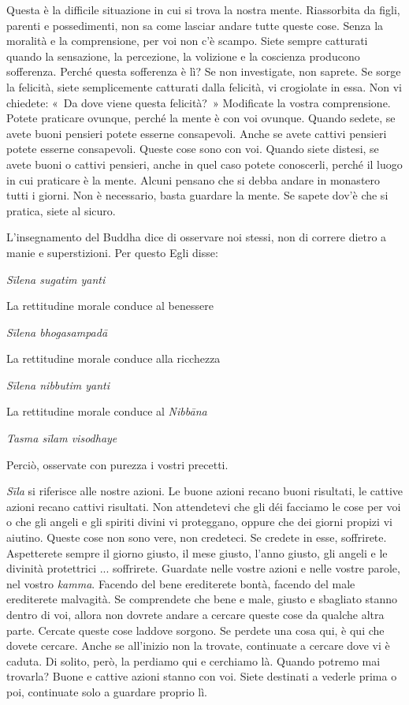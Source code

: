 Questa è la difficile situazione in cui si trova la nostra mente.
Riassorbita da figli, parenti e possedimenti, non sa come lasciar andare
tutte queste cose. Senza la moralità e la comprensione, per voi non c'è
scampo. Siete sempre catturati quando la sensazione, la percezione, la
volizione e la coscienza producono sofferenza. Perché questa sofferenza
è lì? Se non investigate, non saprete. Se sorge la felicità, siete
semplicemente catturati dalla felicità, vi crogiolate in essa. Non vi
chiedete: «~Da dove viene questa felicità?~» Modificate la vostra
comprensione. Potete praticare ovunque, perché la mente è con voi
ovunque. Quando sedete, se avete buoni pensieri potete esserne
consapevoli. Anche se avete cattivi pensieri potete esserne consapevoli.
Queste cose sono con voi. Quando siete distesi, se avete buoni o cattivi
pensieri, anche in quel caso potete conoscerli, perché il luogo in cui
praticare è la mente. Alcuni pensano che si debba andare in monastero
tutti i giorni. Non è necessario, basta guardare la mente. Se sapete
dov'è che si pratica, siete al sicuro.

L'insegnamento del Buddha dice di osservare noi stessi, non di correre
dietro a manie e superstizioni. Per questo Egli disse:

\emph{Sīlena sugatim yanti}

La rettitudine morale conduce al benessere

\emph{Sīlena bhogasampadā}

La rettitudine morale conduce alla ricchezza

\emph{Sīlena nibbutim yanti}

La rettitudine morale conduce al \emph{Nibbāna}

\emph{Tasma sīlam visodhaye}

Perciò, osservate con purezza i vostri precetti.

\emph{Sīla} si riferisce alle nostre azioni. Le buone azioni recano
buoni risultati, le cattive azioni recano cattivi risultati. Non
attendetevi che gli déi facciamo le cose per voi o che gli angeli e gli
spiriti divini vi proteggano, oppure che dei giorni propizi vi aiutino.
Queste cose non sono vere, non credeteci. Se credete in esse,
soffrirete. Aspetterete sempre il giorno giusto, il mese giusto, l'anno
giusto, gli angeli e le divinità protettrici ... soffrirete. Guardate
nelle vostre azioni e nelle vostre parole, nel vostro \emph{kamma}.
Facendo del bene erediterete bontà, facendo del male erediterete
malvagità. Se comprendete che bene e male, giusto e sbagliato stanno
dentro di voi, allora non dovrete andare a cercare queste cose da
qualche altra parte. Cercate queste cose laddove sorgono. Se perdete una
cosa qui, è qui che dovete cercare. Anche se all'inizio non la trovate,
continuate a cercare dove vi è caduta. Di solito, però, la perdiamo qui
e cerchiamo là. Quando potremo mai trovarla? Buone e cattive azioni
stanno con voi. Siete destinati a vederle prima o poi, continuate solo a
guardare proprio lì.


